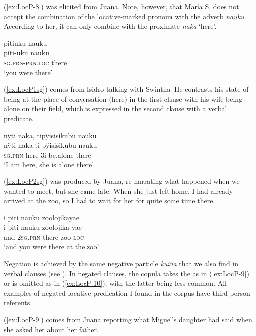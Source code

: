 (\ref{ex:LocP-8}) was elicited from Juana. Note, however, that María S. does not accept the combination of the locative-marked pronoun with the adverb \textit{nauku}. According to her, it can only combine with the proximate \textit{naka} ‘here’.

\ea\label{ex:LocP-8}
\begingl
\glpreamble pitiuku nauku\\
\gla piti-uku nauku\\
\textsc{sg.prn}-\textsc{prn.loc} there\\
\glft ‘you were there’
\endgl
\trailingcitation{[jxx-p150920l.108]}
\xe

(\ref{ex:LocP1sg}) comes from Isidro talking with Swintha. He contrasts his state of being at the place of conversation (here) in the first clause with his wife being alone on their field, which is expressed in the second clause with a verbal predicate.

\ea\label{ex:LocP1sg}
\begingl 
\glpreamble nÿti naka, tipÿisisikubu nauku\\
\gla nÿti naka ti-pÿisisikubu nauku\\ 
\textsc{sg.prn} here 3i-be.alone there\\ 
\glft ‘I am here, she is alone there’\\ 
\endgl
\trailingcitation{[dxx-d120416s.167]}
\xe

(\ref{ex:LocP2sg}) was produced by Juana, re-narrating what happened when we wanted to meet, but she came late. When she just left home, I had already arrived at the zoo, so I had to wait for her for quite some time there.

\ea\label{ex:LocP2sg}
\begingl 
\glpreamble i piti nauku zoolojikayae\\
\gla i piti nauku zoolojika-yae\\ 
\glb and 2\textsc{sg.prn} there zoo-\textsc{loc}\\ 
\glft ‘and you were there at the zoo’\\ 
\endgl
\trailingcitation{[jxx-p110923l-2.044]}
\xe

Negation is achieved by the same negative particle \textit{kuina} that we also find in verbal clauses (see ). In negated clauses, the copula takes the  as in (\ref{ex:LocP-9}) or is omitted as in (\ref{ex:LocP-10}), with the latter being less common. All examples of negated locative predication I found in the corpus have third person referents.

(\ref{ex:LocP-9}) comes from Juana reporting what Miguel’s daughter had said when she asked her about her father.


